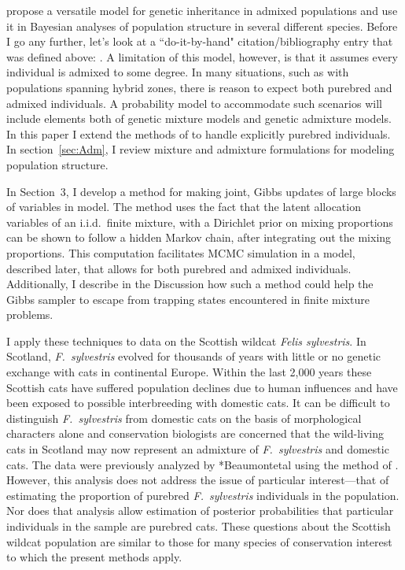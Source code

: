 \documentclass[11pt]{article}
\begin{document}
 propose a versatile model for genetic
inheritance in admixed populations and use it in 
Bayesian analyses of population structure in several different
species.   
Before I go any further, let's look at a ``do-it-by-hand" citation/bibliography
entry that was defined above: \cite{Raftery1992}.  A limitation of this model, however, is that it
assumes every individual is admixed to some degree.  In many
situations, such as with populations spanning hybrid zones, there is
reason to expect both purebred and admixed individuals.  A probability
model to accommodate such scenarios will include elements both of
genetic mixture models and genetic admixture models.  
In this paper I extend the methods of  to handle
explicitly  purebred individuals.  In section~\ref{sec:Adm}, I review mixture and admixture formulations for modeling
population structure.  

In Section~3, I develop a method for making
joint, Gibbs updates of large blocks of variables in  model. 
The method uses the fact that the latent allocation variables of an i.i.d.~finite mixture, with a Dirichlet
prior on mixing proportions can be shown to follow a hidden Markov chain, after integrating out the mixing 
proportions.
This computation facilitates MCMC simulation in a model, described later, that
allows for both purebred and admixed individuals.  
Additionally, I describe in the Discussion how such a method could help
the Gibbs sampler to escape from trapping states \cite{Robert1996}
encountered in finite mixture problems. 

I apply these techniques to data on the Scottish wildcat {\em Felis
sylvestris}. In Scotland, {\em F.~sylvestris} evolved for thousands of
years with little or no genetic exchange with cats in continental
Europe.  Within the last 2,000 years these Scottish cats have suffered
population declines due to human influences and have been exposed to
possible interbreeding with domestic cats.  It can be difficult to
distinguish {\em F.~sylvestris} from domestic cats on the basis of
morphological characters alone and conservation biologists are concerned
that the wild-living cats in Scotland may now represent an admixture of
{\em F.~sylvestris} and domestic cats.  The data were previously analyzed
by \citeasnoun**{Beaumontetal} using the method of .  
However, this analysis does not address the issue of particular
interest---that of 
estimating the proportion of purebred
{\em F.~sylvestris} individuals in the population.  Nor does that analysis allow estimation
of posterior probabilities that particular individuals in the sample are purebred cats.  These questions about
the Scottish wildcat population are similar to those for many species of conservation interest to which the
present methods apply.  
\end{document}
